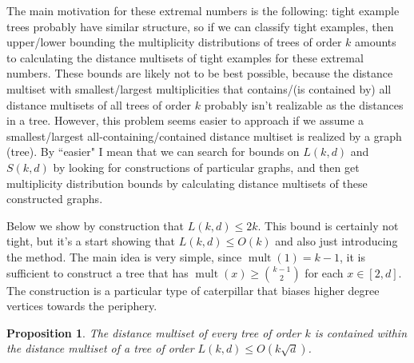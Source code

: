 \documentclass[12]{article}
\DeclareMathOperator{\mult}{mult}
\newtheorem{prop}[thm]{Proposition}
\theoremstyle{definition}
\begin{document}
	The main motivation for these extremal numbers is the following: tight example trees probably have similar structure, so if we can classify tight examples, then upper/lower bounding the multiplicity distributions of trees of order $k$ amounts to calculating the distance multisets of tight examples for these extremal numbers.  These bounds are likely not to be best possible, because the distance multiset with smallest/largest multiplicities that contains/(is contained by) all distance multisets of all trees of order $k$ probably isn't realizable as the distances in a tree.  However, this problem seems easier to approach if we assume a smallest/largest all-containing/contained distance multiset is realized by a graph (tree).  By ``easier" I mean that we can search for bounds on $L(k,d)$ and $S(k,d)$ by looking for constructions of particular graphs, and then get multiplicity distribution bounds by calculating distance multisets of these constructed graphs.  
	
	Below we show by construction that $L(k,d) \leq 2k$.  This bound is certainly not tight, but it's a start showing that $L(k,d) \leq O(k)$ and also just introducing the method.  The main idea is very simple, since $\mult(1) = k-1$, it is sufficient to construct a tree that has $\mult(x) \geq {k-1 \choose 2}$ for each $x \in [2,d]$.  The construction is a particular type of caterpillar that biases higher degree vertices towards the periphery.
	
	\begin{prop}
		The distance multiset of every tree of order $k$ is contained within the distance multiset of a tree of order $L(k,d) \leq O(k\sqrt{d})$.
	\end{prop}
\end{document}
